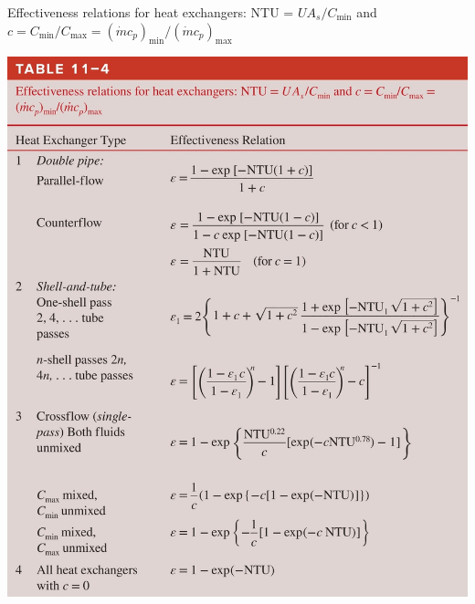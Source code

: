 \begin{table}[H]
    \centering
    \caption{Effectiveness relations for heat exchangers: NTU = $UA_s/C_{\text{min}}$ and $c = C_{\text{min}}/C_{\text{max}} =
    (\dot{m} c_p)_{\text{min}}/(\dot{m} c_p)_{\text{max}}$}
    \includegraphics[width=0.8\linewidth]{Figures/Sec11 table 11-4.jpg}
    \label{tab:sec11_effectiveness_relations}
\end{table}
    